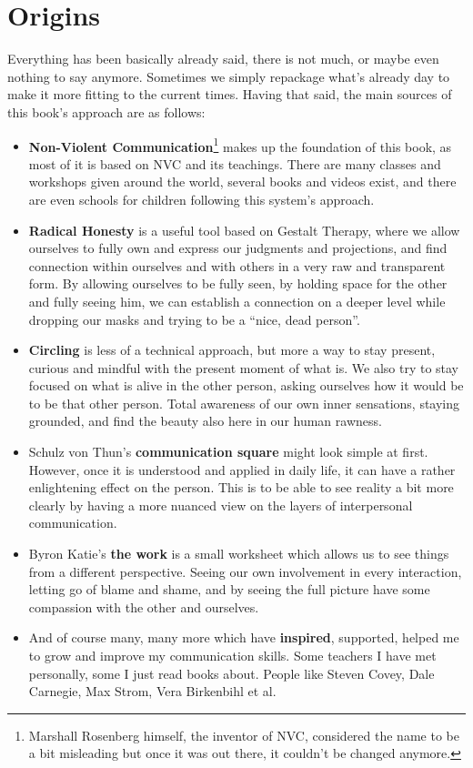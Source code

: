 \section{Origins}\label{sec:origins}


Everything has been basically already said, there is not much, or maybe even nothing to say anymore.
Sometimes we simply repackage what's already day to make it more fitting to the current times.
Having that said, the main sources of this book's approach are as follows:

\begin{itemize}
    \item \textbf{Non-Violent Communication}\footnote{Marshall Rosenberg himself, the inventor of NVC, considered the name to be a bit misleading but once it was out there, it couldn't be changed anymore.} makes up the foundation of this book, as most of it is based on NVC and its teachings.
    There are many classes and workshops given around the world, several books and videos exist, and there are even schools for children following this system's approach.
    \item \textbf{Radical Honesty} is a useful tool based on Gestalt Therapy, where we allow ourselves to fully own and express our judgments and projections, and find connection within ourselves and with others in a very raw and transparent form.
     By allowing ourselves to be fully seen, by holding space for the other and fully seeing him, we can establish a connection on a deeper level while dropping our masks and trying to be a ``nice, dead person''.
    \item \textbf{Circling} is less of a technical approach, but more a way to stay present, curious and mindful with the present moment of what is.
     We also try to stay focused on what is alive in the other person, asking ourselves how it would be to be that other person.
     Total awareness of our own inner sensations, staying grounded, and find the beauty also here in our human rawness.
    \item Schulz von Thun's \textbf{communication square} might look simple at first.
    However, once it is understood and applied in daily life, it can have a rather enlightening effect on the person.
    This is to be able to see reality a bit more clearly by having a more nuanced view on the layers of interpersonal communication.
    \item Byron Katie's \textbf{the work} is a small worksheet which allows us to see things from a different perspective.
    Seeing our own involvement in every interaction, letting go of blame and shame, and by seeing the full picture have some compassion with the other and ourselves.
    \item And of course many, many more which have \textbf{inspired}, supported, helped me to grow and improve my communication skills.
    Some teachers I have met personally, some I just read books about.
    People like Steven Covey, Dale Carnegie, Max Strom, Vera Birkenbihl et al.
\end{itemize}
